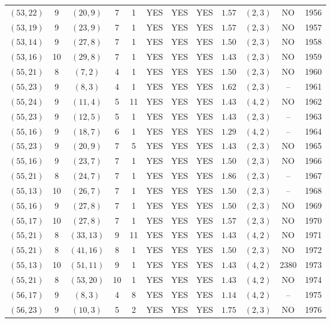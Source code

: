 \begin{longtable}{|c|c|c|c|c|c|c|c|c|c|c|c|}
$(53,22)$ & 9 & $(20,9)$ & 7 & 1 & YES & YES & YES & $1.57$ & $(2,3)$ & NO & 1956\\
$(53,19)$ & 9 & $(23,9)$ & 7 & 1 & YES & YES & YES & $1.57$ & $(2,3)$ & NO & 1957\\
$(53,14)$ & 9 & $(27,8)$ & 7 & 1 & YES & YES & YES & $1.50$ & $(2,3)$ & NO & 1958\\
$(53,16)$ & 10 & $(29,8)$ & 7 & 1 & YES & YES & YES & $1.43$ & $(2,3)$ & NO & 1959\\
$(55,21)$ & 8 & $(7,2)$ & 4 & 1 & YES & YES & YES & $1.50$ & $(2,3)$ & NO & 1960\\
$(55,23)$ & 9 & $(8,3)$ & 4 & 1 & YES & YES & YES & $1.62$ & $(2,3)$ & -- & 1961\\
$(55,24)$ & 9 & $(11,4)$ & 5 & 11 & YES & YES & YES & $1.43$ & $(4,2)$ & NO & 1962\\
$(55,23)$ & 9 & $(12,5)$ & 5 & 1 & YES & YES & YES & $1.43$ & $(2,3)$ & -- & 1963\\
$(55,16)$ & 9 & $(18,7)$ & 6 & 1 & YES & YES & YES & $1.29$ & $(4,2)$ & -- & 1964\\
$(55,23)$ & 9 & $(20,9)$ & 7 & 5 & YES & YES & YES & $1.43$ & $(2,3)$ & NO & 1965\\
$(55,16)$ & 9 & $(23,7)$ & 7 & 1 & YES & YES & YES & $1.50$ & $(2,3)$ & NO & 1966\\
$(55,21)$ & 8 & $(24,7)$ & 7 & 1 & YES & YES & YES & $1.86$ & $(2,3)$ & -- & 1967\\
$(55,13)$ & 10 & $(26,7)$ & 7 & 1 & YES & YES & YES & $1.50$ & $(2,3)$ & -- & 1968\\
$(55,16)$ & 9 & $(27,8)$ & 7 & 1 & YES & YES & YES & $1.50$ & $(2,3)$ & NO & 1969\\
$(55,17)$ & 10 & $(27,8)$ & 7 & 1 & YES & YES & YES & $1.57$ & $(2,3)$ & NO & 1970\\
$(55,21)$ & 8 & $(33,13)$ & 9 & 11 & YES & YES & YES & $1.43$ & $(4,2)$ & NO & 1971\\
$(55,21)$ & 8 & $(41,16)$ & 8 & 1 & YES & YES & YES & $1.50$ & $(2,3)$ & NO & 1972\\
$(55,13)$ & 10 & $(51,11)$ & 9 & 1 & YES & YES & YES & $1.43$ & $(4,2)$ & 2380 & 1973\\
$(55,21)$ & 8 & $(53,20)$ & 10 & 1 & YES & YES & YES & $1.43$ & $(4,2)$ & NO & 1974\\
$(56,17)$ & 9 & $(8,3)$ & 4 & 8 & YES & YES & YES & $1.14$ & $(4,2)$ & -- & 1975\\
$(56,23)$ & 9 & $(10,3)$ & 5 & 2 & YES & YES & YES & $1.75$ & $(2,3)$ & NO & 1976\\

\end{longtable}
